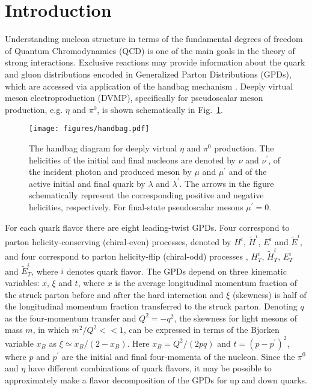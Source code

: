 \documentclass[prc,aps,floatfix,showpacs,showkeys,twocolumn,superscriptaddress,letterpaper,10pt]{revtex4-1}
\begin{document}
\maketitle




\section{Introduction}	

Understanding nucleon structure in terms of the fundamental degrees of freedom of Quantum Chromodynamics (QCD) is one of the main goals in the theory of strong interactions.   Exclusive reactions may provide information about the quark and gluon distributions encoded in  Generalized Parton Distributions (GPDs), which are accessed via application of the handbag mechanism  
\cite{Ji:1996ek,*Ji:1996nm,Radyushkin:1996nd,*Radyushkin:1997ki} .
Deeply virtual meson electroproduction  (DVMP),  specifically for  pseudoscalar meson production, e.g.  $\eta$ and $\pi^0$, is shown  schematically in Fig.~\ref{fig:handbag-pi0}. 
\begin{figure}[h]
\texttt{[image: figures/handbag.pdf]}
\caption{
\label{fig:handbag-pi0} 
The handbag diagram for  deeply virtual  $\eta$ and $\pi^0$ production.
The helicities of the initial and final nucleons are denoted by $\nu$ and $\nu^\prime$, of the incident photon and produced meson by $\mu$ and $\mu^\prime$ and of the active initial and final quark by $\lambda$ and $\lambda^\prime$. The arrows in the figure schematically represent the corresponding positive and negative helicities, respectively. 
For final-state pseudoscalar mesons  $\mu^\prime =  0$.
}
\end{figure}

For each quark flavor 
there are  eight leading-twist GPDs. Four correspond to  parton helicity-conserving (chiral-even) processes,  denoted 
by $H^i$,  $\tilde H^i$,  $E^i$ and  $\tilde E^i$, and 
four correspond to parton helicity-flip (chiral-odd) processes  
\cite{Hoodbhoy:1998vm,Diehl:2003ny},  $H^i_T$,  $\tilde H^i_T$,  $E^i_T$ and  $\tilde E^i_T$, 
where 
$i$
denotes quark flavor. 
The GPDs depend on three kinematic variables: $x$, $\xi$ and $t$, where $x$ is the   average longitudinal momentum fraction of  the struck parton before and after the hard interaction and $\xi$ (skewness) is half of the longitudinal momentum fraction transferred to  the struck parton.  Denoting $q$ as the four-momentum transfer and  $Q^2=-q^2$,
the skewness for light mesons of mass $m$, in which  $m^2/Q^2 << 1$, can be expressed in terms of the   Bjorken variable $x_B$  as
$\xi\simeq x_B/(2-x_B)$. Here $x_B=Q^2/(2pq)$ and $t=(p-p^\prime)^2$, where $p$ and $p^\prime$ are the initial and final four-momenta of the nucleon. 
Since the $\pi^0$ and $\eta$  have different combinations of quark flavors, it may be possible 
to  approximately make  a flavor decomposition of the GPDs for up and down quarks.
\end{document}
